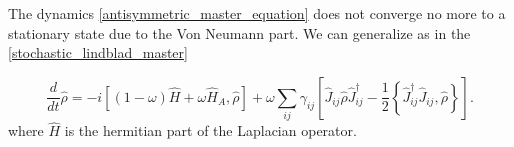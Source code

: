 The dynamics \eqref{antisymmetric_master_equation} does not converge no more to a stationary state due to the Von Neumann part.
We can generalize as in the \eqref{stochastic_lindblad_master} 

\begin{equation}
    \frac{d}{dt}\hat \rho = -i\left[(1-\omega)\hat H + \omega\hat H_{A},\hat\rho\right] + \omega\sum_{ij}\gamma_{ij}\left[\hat J_{ij} \hat\rho\hat J_{ij}^\dagger -\frac{1}{2} \left\{ \hat J_{ij}^\dagger \hat J_{ij}, \hat\rho\right\}\right].
\end{equation}
where $\hat H$ is the hermitian part of the Laplacian operator.


